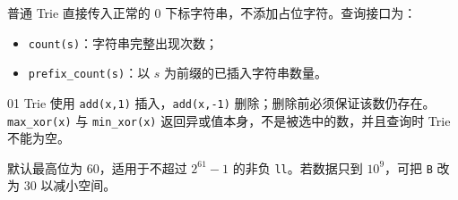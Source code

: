 普通 Trie 直接传入正常的 $0$ 下标字符串，不添加占位字符。查询接口为：

\begin{itemize}
  \item \texttt{count(s)}：字符串完整出现次数；
  \item \texttt{prefix\_count(s)}：以 $s$ 为前缀的已插入字符串数量。
\end{itemize}

01 Trie 使用 \texttt{add(x,1)} 插入，\texttt{add(x,-1)} 删除；删除前必须保证该数仍存在。\texttt{max\_xor(x)} 与 \texttt{min\_xor(x)} 返回异或值本身，不是被选中的数，并且查询时 Trie 不能为空。

默认最高位为 $60$，适用于不超过 $2^{61}-1$ 的非负 \texttt{ll}。若数据只到 $10^9$，可把 \texttt{B} 改为 $30$ 以减小空间。
